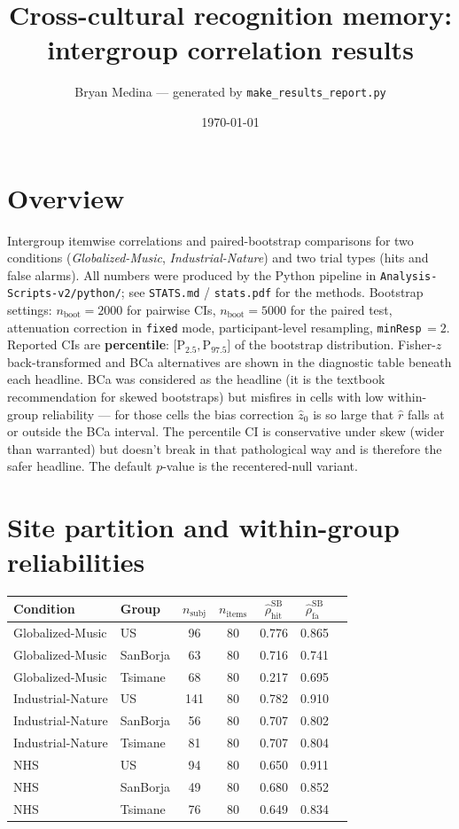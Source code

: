 \documentclass[11pt]{article}
\title{Cross-cultural recognition memory: intergroup correlation results}
\author{Bryan Medina --- generated by \texttt{make\_results\_report.py}}
\date{\today}
\begin{document}
\maketitle

\section*{Overview}
Intergroup itemwise correlations and paired-bootstrap comparisons for two conditions (\emph{Globalized-Music}, \emph{Industrial-Nature}) and two trial types (hits and false alarms). All numbers were produced by the Python pipeline in \texttt{Analysis-Scripts-v2/python/}; see \texttt{STATS.md} / \texttt{stats.pdf} for the methods. Bootstrap settings: $n_{\mathrm{boot}}=2000$ for pairwise CIs, $n_{\mathrm{boot}}=5000$ for the paired test, attenuation correction in \texttt{fixed} mode, participant-level resampling, \texttt{minResp}\,$=2$. Reported CIs are \textbf{percentile}: $\bigl[\mathrm{P}_{2.5}, \mathrm{P}_{97.5}\bigr]$ of the bootstrap distribution. Fisher-$z$ back-transformed and BCa alternatives are shown in the diagnostic table beneath each headline. BCa was considered as the headline (it is the textbook recommendation for skewed bootstraps) but misfires in cells with low within-group reliability --- for those cells the bias correction $\hat z_0$ is so large that $\hat r$ falls at or outside the BCa interval. The percentile CI is conservative under skew (wider than warranted) but doesn't break in that pathological way and is therefore the safer headline. The default $p$-value is the recentered-null variant.

\section*{Site partition and within-group reliabilities}
\begin{center}
\begin{tabular}{llccccc}
\toprule
Condition & Group & $n_{\mathrm{subj}}$ & $n_{\mathrm{items}}$ & $\hat{\rho}^{\mathrm{SB}}_{\mathrm{hit}}$ & $\hat{\rho}^{\mathrm{SB}}_{\mathrm{fa}}$ \\
\midrule
Globalized-Music & US & 96 & 80 & 0.776 & 0.865 \\
Globalized-Music & SanBorja & 63 & 80 & 0.716 & 0.741 \\
Globalized-Music & Tsimane & 68 & 80 & 0.217 & 0.695 \\
\midrule
Industrial-Nature & US & 141 & 80 & 0.782 & 0.910 \\
Industrial-Nature & SanBorja & 56 & 80 & 0.707 & 0.802 \\
Industrial-Nature & Tsimane & 81 & 80 & 0.707 & 0.804 \\
\midrule
NHS & US & 94 & 80 & 0.650 & 0.911 \\
NHS & SanBorja & 49 & 80 & 0.680 & 0.852 \\
NHS & Tsimane & 76 & 80 & 0.649 & 0.834 \\
\midrule
\bottomrule
\end{tabular}
\end{center}
\end{document}
